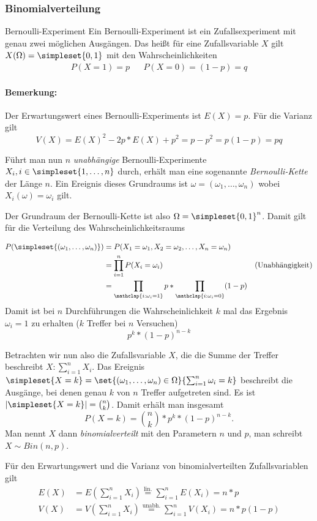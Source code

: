 \subsubsection{Binomialverteilung}
\begin{definition}{Bernoulli-Experiment}
	Ein Bernoulli-Experiment ist ein Zufallsexperiment mit genau zwei möglichen Ausgängen. Das heißt für eine Zufallsvariable $X$ gilt $X(\Omega)=\simpleset{0,1}$ mit den Wahrscheinlichkeiten
	\begin{align*}
		P(X=1)=p && P(X=0)=(1-p)=q
	\end{align*}
\end{definition}
\paragraph{Bemerkung:}
Der Erwartungswert eines Bernoulli-Experiments ist $E(X)=p$. Für die Varianz gilt 
\begin{equation*}
	V(X)=E(X)^2-2p*E(X)+p^2=p-p^2=p(1-p)=pq
\end{equation*}

Führt man nun $n$ \emph{unabhängige} Bernoulli-Experimente $X_i, i\in\simpleset{1,\ldots,n}$ durch, erhält man eine sogenannte \emph{Bernoulli-Kette} der Länge $n$. Ein Ereignis dieses Grundraums ist $\omega=(\omega_1,\ldots,\omega_n)$ wobei $X_i(\omega)=\omega_i$ gilt.

Der Grundraum der Bernoulli-Kette ist also $\Omega=\simpleset{0,1}^n$. Damit gilt für die Verteilung des Wahrscheinlichkeitsraums

\begin{align*}
	P(\simpleset{(\omega_1,\ldots,\omega_n)})&=P(X_1=\omega_1, X_2=\omega_2, \ldots, X_n=\omega_n)\\
	&=\prod_{i=1}^n P(X_i=\omega_i) &\text{(Unabhängigkeit)}\\
	&=\prod_{\mathclap{i:\omega_i=1}}p * \prod_{\mathclap{i:\omega_i=0}}(1-p)
\end{align*}
Damit ist bei $n$ Durchführungen die Wahrscheinlichkeit $k$ mal das Ergebnis $\omega_i=1$ zu erhalten ($k$ Treffer bei $n$ Versuchen) 
\begin{equation*}
	p^k*(1-p)^{n-k}
\end{equation*}

Betrachten wir nun also die Zufallsvariable $X$, die die Summe der Treffer beschreibt $X:\sum_{i=1}^n X_i$.
Das Ereignis $\simpleset{X=k}=\set{(\omega_1,\ldots,\omega_n)\in\Omega}{\sum_{i=1}^n \omega_i=k}$ beschreibt die Ausgänge, bei denen genau $k$ von $n$ Treffer aufgetreten sind. Es ist $|\simpleset{X=k}|=\binom nk$. Damit erhält man insgesamt
\begin{equation*}
	P(X=k)=\binom nk * p^k*(1-p)^{n-k}.
\end{equation*}
Man nennt $X$ dann \emph{binomialverteilt} mit den Parametern $n$ und $p$, man schreibt $X\sim Bin(n,p)$.

Für den Erwartungswert und die Varianz von binomialverteilten Zufallsvariablen gilt
\begin{align*}
	E(X)&=E\left(\sum_{i=1}^n X_i\right)\overset{\text{lin.}}=\sum_{i=1}^n E(X_i)=n*p\\
	V(X)&=V\left(\sum_{i=1}^n X_i\right)\overset{\text{unabh.}}=\sum_{i=1}^n V(X_i)=n*p(1-p)
\end{align*}